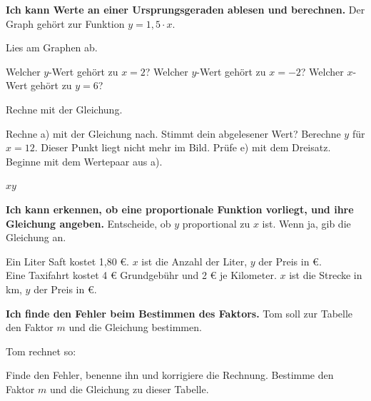 \begin{aufgabe}{\textbf{Ich kann Werte an einer Ursprungsgeraden ablesen und berechnen.} Der Graph gehört zur Funktion $y = 1{,}5 \cdot x$.}

\begin{ksys}[xmin=-3,xmax=5,ymin=-4,ymax=7,ablesen]
\end{ksys}

Lies am Graphen ab.
\begin{teile}
\teil Welcher $y$-Wert gehört zu $x = 2$? \quad {}
\teil Welcher $y$-Wert gehört zu $x = -2$? \quad {}
\teil Welcher $x$-Wert gehört zu $y = 6$? \quad {}
\end{teile}
Rechne mit der Gleichung.
\begin{teile}
\teil Rechne a) mit der Gleichung nach. Stimmt dein abgelesener Wert?
\teil Berechne $y$ für $x = 12$. Dieser Punkt liegt nicht mehr im Bild. \quad {}
\teil Prüfe e) mit dem Dreisatz. Beginne mit dem Wertepaar aus a).
\end{teile}
\begin{dreisatz}{$x$}{$y$}
\end{dreisatz}
\end{aufgabe}

\begin{aufgabe}{\textbf{Ich kann erkennen, ob eine proportionale Funktion vorliegt, und ihre Gleichung angeben.} Entscheide, ob $y$ proportional zu $x$ ist. Wenn ja, gib die Gleichung an.}
\begin{teile}
\teil {} \par \janein \quad {}
\teil {} \par \janein \quad {}
\teil {} \par \janein \quad {}
\teil {} \par \janein \quad {}
\teil Ein Liter Saft kostet 1,80 €. $x$ ist die Anzahl der Liter, $y$ der Preis in €. \\ \janein \quad {}
\teil Eine Taxifahrt kostet 4 € Grundgebühr und 2 € je Kilometer. $x$ ist die Strecke in km, $y$ der Preis in €. \\ \janein \quad {}
\end{teile}
\end{aufgabe}

\begin{aufgabe}{\textbf{Ich finde den Fehler beim Bestimmen des Faktors.} Tom soll zur Tabelle den Faktor $m$ und die Gleichung bestimmen.}


Tom rechnet so:
\begin{teile}
\teil Finde den Fehler, benenne ihn und korrigiere die Rechnung.
\teil Bestimme den Faktor $m$ und die Gleichung zu dieser Tabelle.
\end{teile}

\end{aufgabe}

